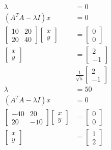 \documentclass[main.tex]{subfiles}
\begin{document}
\begin{enumerate}
    $$
    \begin{aligned}
    \lambda &= 0\\
    \left(A^{T} A-\lambda I\right) x&=0\\
    \left[\begin{array}{ll}
    10 & 20 \\
    20 & 40
    \end{array}\right]\left[\begin{array}{l}
    x \\
    y
    \end{array}\right] &=\left[\begin{array}{l}
    0 \\
    0
    \end{array}\right] \\
    {\left[\begin{array}{l}
    x \\
    y
    \end{array}\right] } &=\left[\begin{array}{l}
    2 \\
    -1
    \end{array}\right]\\
    &\frac{1}{\sqrt{5}}\left[\begin{array}{l}
    2 \\
    -1
    \end{array}\right]\\
    \lambda &= 50\\
    \left(A^{T} A-\lambda I\right) x&=0\\
    {\left[\begin{array}{cc}
    -40 & 20 \\
    20 & -10
    \end{array}\right]\left[\begin{array}{l}
    x \\
    y
    \end{array}\right] } &=\left[\begin{array}{l}
    0 \\
    0
    \end{array}\right] \\
    {\left[\begin{array}{l}
    x \\
    y
    \end{array}\right] } &=\left[\begin{array}{l}
    1 \\
    2
    \end{array}\right]\\

\end{aligned}$$
\end{enumerate}
\end{document}

